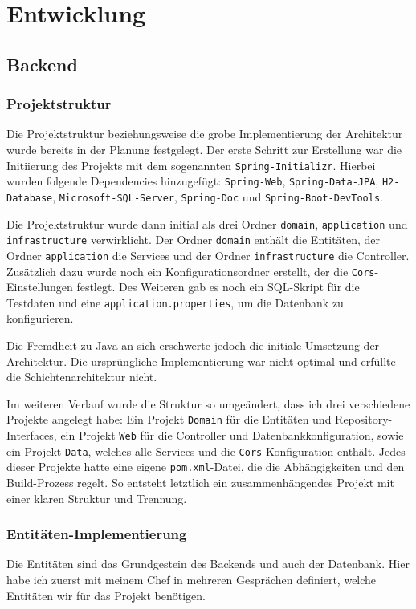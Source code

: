 \chapter{Entwicklung}\label{ch:method}
\section{Backend}
\subsection{Projektstruktur}
Die Projektstruktur beziehungsweise die grobe Implementierung der Architektur wurde bereits in der Planung festgelegt. 
Der erste Schritt zur Erstellung war die Initiierung des Projekts mit dem sogenannten \texttt{Spring-Initializr}. 
Hierbei wurden folgende Dependencies hinzugefügt: \texttt{Spring-Web}, \texttt{Spring-Data-JPA}, \texttt{H2-Database}, \texttt{Microsoft-SQL-Server}, \texttt{Spring-Doc} und \texttt{Spring-Boot-DevTools}.

Die Projektstruktur wurde dann initial als drei Ordner \texttt{domain}, \texttt{application} und \texttt{infrastructure} verwirklicht.
Der Ordner \texttt{domain} enthält die Entitäten, der Ordner \texttt{application} die Services und der Ordner \texttt{infrastructure} die Controller.
Zusätzlich dazu wurde noch ein Konfigurationsordner erstellt, der die \texttt{Cors}-Einstellungen festlegt. 
Des Weiteren gab es noch ein SQL-Skript für die Testdaten und eine \texttt{application.properties}, um die Datenbank zu konfigurieren.

Die Fremdheit zu Java an sich erschwerte jedoch die initiale Umsetzung der Architektur. Die ursprüngliche Implementierung war nicht optimal und erfüllte
die Schichtenarchitektur nicht.

Im weiteren Verlauf wurde die Struktur so umgeändert, dass ich drei verschiedene Projekte angelegt habe: 
Ein Projekt \texttt{Domain} für die Entitäten und Repository-Interfaces, ein Projekt \texttt{Web} für die Controller und Datenbankkonfiguration, sowie ein Projekt \texttt{Data}, 
welches alle Services und die \texttt{Cors}-Konfiguration enthält. Jedes dieser Projekte hatte eine eigene \texttt{pom.xml}-Datei, die 
die Abhängigkeiten und den Build-Prozess regelt. So entsteht letztlich ein zusammenhängendes Projekt mit einer klaren Struktur und Trennung.


\subsection{Entitäten-Implementierung}
Die Entitäten sind das Grundgestein des Backends und auch der Datenbank.
Hier habe ich zuerst mit meinem Chef in mehreren Gesprächen definiert, welche Entitäten wir für das Projekt benötigen.

